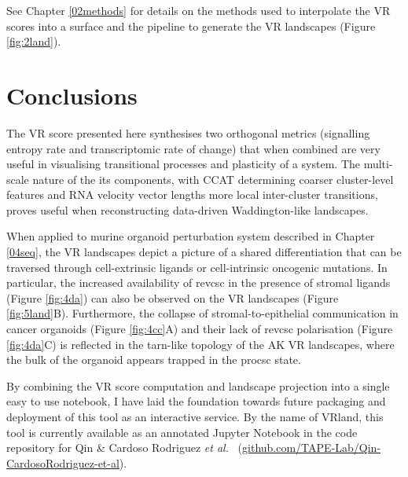 See Chapter \ref{02methods} for details on the methods used to interpolate the VR scores into a surface and the pipeline to generate the VR landscapes (Figure \ref{fig:2land}).

\newpage
\section{Conclusions}

The VR score presented here synthesises two orthogonal metrics (signalling entropy rate and transcriptomic rate of change) that when combined are very useful in visualising transitional processes and plasticity of a system. The multi-scale nature of the its components, with CCAT determining coarser cluster-level features and RNA velocity vector lengths more local inter-cluster transitions, proves useful when reconstructing data-driven Waddington-like landscapes. 

When applied to murine organoid perturbation system described in Chapter \ref{04seq}, the VR landscapes depict a picture of a shared differentiation that can be traversed through cell-extrinsic ligands or cell-intrinsic oncogenic mutations. In particular, the increased availability of \acrshort{revcsc} in the presence of stromal ligands (Figure \ref{fig:4da}) can also be observed on the VR landscapes (Figure \ref{fig:5land}B). Furthermore, the collapse of stromal-to-epithelial communication in cancer organoids (Figure \ref{fig:4cc}A) and their lack of \acrshort{revcsc} polarisation (Figure \ref{fig:4da}C) is reflected in the tarn-like topology of the AK VR landscapes, where the bulk of the organoid appears trapped in the \acrshort{procsc} state.

By combining the VR score computation and landscape projection into a single easy to use notebook, I have laid the foundation towards future packaging and deployment of this tool as an interactive service. By the name of VRland, this tool is currently available as an annotated Jupyter Notebook in the code repository for Qin \& Cardoso Rodriguez \emph{et al.}~\cite{cardoso_rodriguez_single-cell_2023} (\href{www.github.com/TAPE-Lab/Qin-CardosoRodriguez-et-al}{github.com/TAPE-Lab/Qin-CardosoRodriguez-et-al}).
